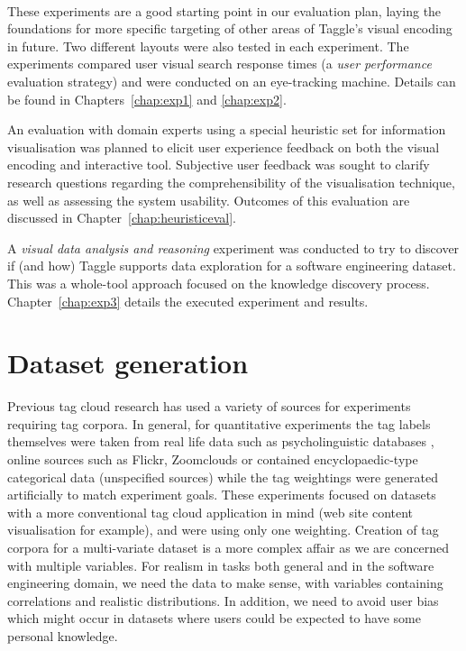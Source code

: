 \paragraph{}These experiments are a good starting point in our evaluation plan, laying the foundations for more specific targeting of other areas of Taggle's visual encoding in future. Two different layouts were also tested in each experiment. The experiments compared user visual search response times (a \emph{user performance} evaluation strategy) and were conducted on an eye-tracking machine. Details can be found in Chapters~\ref{chap:exp1} and \ref{chap:exp2}.

An evaluation with domain experts using a special heuristic set for information visualisation was planned to elicit user experience feedback on both the visual encoding and interactive tool. Subjective user feedback was sought to clarify research questions regarding the comprehensibility of the visualisation technique, as well as assessing the system usability. Outcomes of this evaluation are discussed in Chapter~\ref{chap:heuristiceval}.

A \emph{visual data analysis and reasoning} experiment was conducted to try to discover if (and how) Taggle supports data exploration for a software engineering dataset. This was a whole-tool approach focused on the knowledge discovery process. Chapter~\ref{chap:exp3} details the executed experiment and results. 

\section{Dataset generation}\label{sect:dataselection}

Previous tag cloud research has used a variety of sources for experiments requiring tag corpora. In general, for quantitative experiments the tag labels themselves were taken from real life data such as psycholinguistic databases \citep{bateman08, rivadeneira07}, online sources such as Flickr, Zoomclouds \citep{schrammel09, kaser07} or contained encyclopaedic-type categorical data (unspecified sources) \citep{oosterman10, halvey07} while the tag weightings were generated artificially to match experiment goals. These experiments focused on datasets with a more conventional tag cloud application in mind (web site content visualisation for example), and were using only one weighting. Creation of tag corpora for a multi-variate dataset is a more complex affair as we are concerned with multiple variables. For realism in tasks both general and in the software engineering domain, we need the data to make sense, with variables containing correlations and realistic distributions. In addition, we need to avoid user bias which might occur in datasets where users could be expected to have some personal knowledge.

